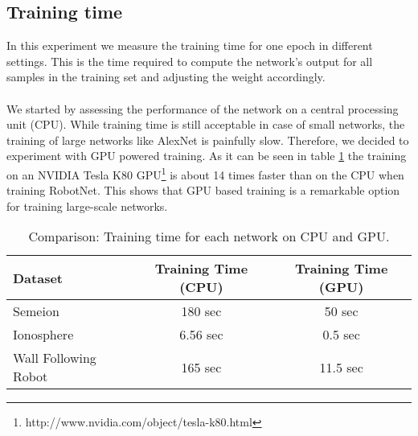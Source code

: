 \documentclass[a4paper, 11pt, twoside, openright]{article}
\begin{document}
\subsection{Training time}

In this experiment we measure the training time for one epoch in different settings. This is the time required to compute the network's output for all samples in the training set and adjusting the weight accordingly.
\\ \\
We started by assessing the performance of the network on a central processing unit (CPU). While training time is still acceptable in case of small networks, the training of large networks like AlexNet is painfully slow. Therefore, we decided to experiment with GPU powered training. As it can be seen in table \ref{training_times} the training on an NVIDIA Tesla K80 GPU\footnote{http://www.nvidia.com/object/tesla-k80.html} is about 14 times faster than on the CPU when training RobotNet. This shows that GPU based training is a remarkable option for training large-scale networks.
\vspace*{5mm}
\begin{table}[h!] \label{table:training_time}
	\centering
	\begin{tabular}{ | l | c | c | }
		\hline
	  \textbf{Dataset} & \textbf{Training Time (CPU)} & \textbf{Training Time (GPU)} \\
		\hline
	  Semeion & 180 sec & 50 sec \\
		\hline
	  Ionosphere & 6.56 sec & 0.5 sec \\
		\hline
		Wall Following Robot & 165 sec & 11.5 sec \\
		\hline
	\end{tabular}
	\caption{Comparison: Training time for each network on CPU and GPU.}
	\label{training_times}
\end{table}
\end{document}
